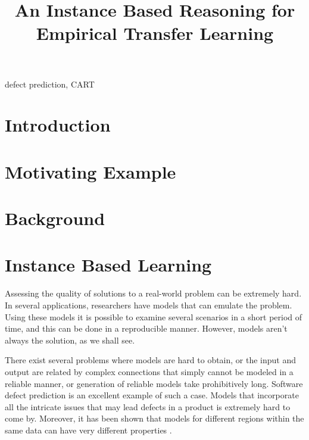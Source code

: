 \documentclass[conference]{IEEEtran}
\begin{document}
  \title{An Instance Based Reasoning for Empirical Transfer Learning}
  
  \author{
    \and
    }
  
  \maketitle
  
  
  \begin{abstract}
 
  \end{abstract}
  \begin{IEEEkeywords}
    defect prediction, CART
  \end{IEEEkeywords}
  
\section{Introduction}
\section{Motivating Example}
\section{Background}
\section{Instance Based Learning}

Assessing the quality of solutions to a real-world problem can be extremely hard. In several applications, researchers have models that can emulate the problem. Using these models it is possible to examine several scenarios in a short period of time, and this can be done in a reproducible manner. However, models aren't always the solution, as we shall see. 

There exist several problems where models are hard to obtain, or the input and output are related by complex connections that simply cannot be modeled in a reliable manner, or generation of reliable models take prohibitively long. Software defect prediction is an excellent example of such a case. Models that incorporate all the intricate issues that may lead defects in a product is extremely hard to come by. Moreover, it has been shown that models for different regions within the same data can have very different properties \cite{}. 
\end{document}
